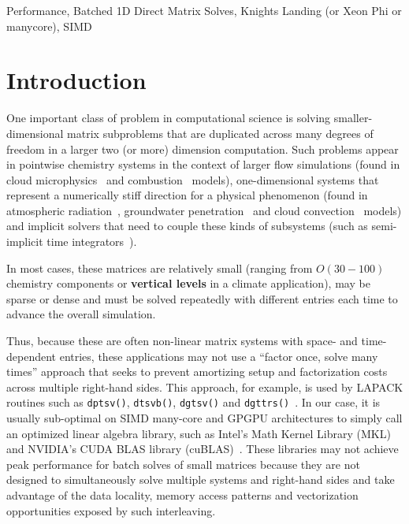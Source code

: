 \documentclass[10pt, conference, compsocconf]{IEEEtran}
\begin{document}
\begin{IEEEkeywords}
Performance, Batched 1D Direct Matrix Solves, Knights Landing (or Xeon Phi or
manycore), SIMD
\end{IEEEkeywords}

\section{Introduction}
\label{sec:intro}

One important class of problem in computational science is solving
  smaller-dimensional matrix subproblems that are duplicated across
  many degrees of freedom in a larger two (or more) dimension computation.
Such problems appear in
  pointwise chemistry systems in the context of larger 
    flow simulations (found in cloud microphysics~\cite{climate_mg2} and
    combustion~\cite{combustion_pazner} models),
  one-dimensional systems that represent a numerically stiff
    direction for a physical phenomenon (found in atmospheric
    radiation~\cite{climate_rrtmg}, groundwater
    penetration~\cite{pflotran_groundwater} and cloud
    convection~\cite{climate_sam} models) and
  implicit solvers that need to couple these kinds of subsystems
    (such as semi-implicit time integrators~\cite{imex}).

In most cases, these matrices are relatively small 
  (ranging from \(O(30-100)\) chemistry components or \textbf{vertical levels}
  in a climate application), may be sparse or dense and must be solved
  repeatedly with different entries each time to advance the overall simulation.

Thus, because these are often non-linear matrix systems with space- and 
  time-dependent entries, these applications may not use a 
  ``factor once, solve many times'' approach that seeks to prevent amortizing
  setup and factorization costs across multiple right-hand sides.
This approach, for example, is used by 
  LAPACK routines such as \lstinline{dptsv()}, \lstinline{dtsvb()},
  \lstinline{dgtsv()} and
  \lstinline{dgttrs()}~\cite{mkl}.
In our case, it is usually sub-optimal on SIMD many-core and GPGPU
  architectures to simply call an optimized linear algebra library, 
  such as Intel's Math Kernel Library (MKL)~\cite{mkl} and NVIDIA's
  CUDA BLAS library (cuBLAS)~\cite{cublas}.
These libraries may not achieve peak performance for batch solves of small
  matrices because they are not designed to simultaneously solve multiple systems
  and right-hand sides and take advantage of the data locality, memory
  access patterns and vectorization opportunities exposed by such interleaving. 
  
\end{document}

